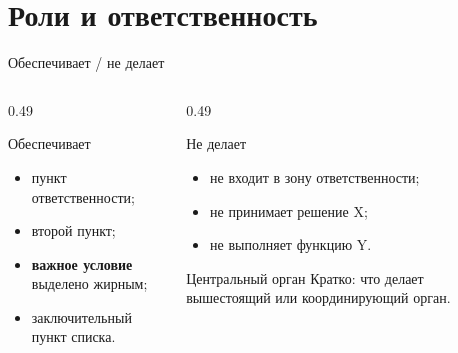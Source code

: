 \section{Роли и ответственность}

\begin{frame}{Обеспечивает / не делает}
  \vspace{0.3em}
  \begin{columns}[T]
    \begin{column}{0.49\textwidth}
      \begin{block}{Обеспечивает}
        \begin{itemize}\setlength\itemsep{0.28em}
          \item пункт ответственности;
          \item второй пункт;
          \item \textbf{важное условие} выделено жирным;
          \item заключительный пункт списка.
        \end{itemize}
      \end{block}
    \end{column}
    \begin{column}{0.49\textwidth}
      \begin{block}{Не делает}
        \begin{itemize}\setlength\itemsep{0.28em}
          \item не входит в зону ответственности;
          \item не принимает решение X;
          \item не выполняет функцию Y.
        \end{itemize}
      \end{block}
      \begin{block}{Центральный орган}
        Кратко: что делает вышестоящий или координирующий орган.
      \end{block}
    \end{column}
  \end{columns}
\end{frame}

